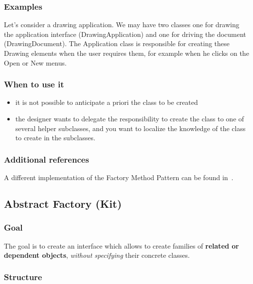 \documentclass{article}
\begin{document}
\subsubsection{Examples}
Let's consider a drawing application. We may have two classes one for drawing the application interface (DrawingApplication) and one for driving the document (DrawingDocument). The Application class is responsible for creating these Drawing elements when the user requires them, for example when he clicks on the Open or New menus.

\subsubsection{When to use it}
\begin{itemize}
\item it is not possible to anticipate a priori the class to be created
\item the designer wants to delegate the responsibility to create the class to one of several helper subclasses, and you want to localize the knowledge of the class to create in the subclasses.
\end{itemize}

\subsubsection{Additional references}
A different implementation of the Factory Method Pattern can be found in~\cite{gamma1994design}.


\subsection{Abstract Factory (Kit)}
\subsubsection{Goal}
The goal is to create an interface which allows to create families of \textbf{related or dependent objects}, \textit{without specifying} their concrete classes. 

\subsubsection{Structure}
\end{document}
